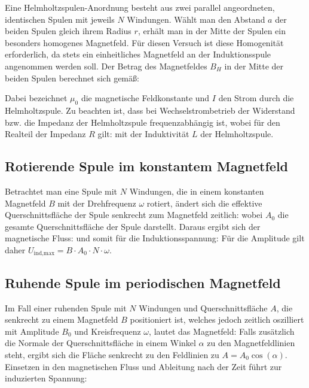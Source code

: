 Eine Helmholtzspulen-Anordnung besteht aus zwei parallel angeordneten, identischen Spulen mit jeweils \( N \) Windungen. Wählt man den Abstand \( a \) der beiden Spulen gleich ihrem Radius \( r \), erhält man in der Mitte der Spulen ein besonders homogenes Magnetfeld. Für diesen Versuch ist diese Homogenität erforderlich, da stets ein einheitliches Magnetfeld an der Induktionsspule angenommen werden soll. Der Betrag des Magnetfeldes \( B_H \) in der Mitte der beiden Spulen berechnet sich gemäß:

Dabei bezeichnet \( \mu_0 \) die magnetische Feldkonstante und \( I \) den Strom durch die Helmholtzspule. Zu beachten ist, dass bei Wechselstrombetrieb der Widerstand bzw. die Impedanz der Helmholtzspule frequenzabhängig ist, wobei für den Realteil der Impedanz \( R \) gilt:
mit der Induktivität \( L \) der Helmholtzspule.

\subsection{Rotierende Spule im konstantem Magnetfeld}

Betrachtet man eine Spule mit \( N \) Windungen, die in einem konstanten Magnetfeld \( B \) mit der Drehfrequenz \( \omega \) rotiert, ändert sich die effektive Querschnittsfläche der Spule senkrecht zum Magnetfeld zeitlich:
wobei \( A_0 \) die gesamte Querschnittsfläche der Spule darstellt. Daraus ergibt sich der magnetische Fluss:
und somit für die Induktionsspannung:
Für die Amplitude gilt daher \( U_{\text{ind,max}} = B \cdot A_0 \cdot N \cdot \omega \).

\subsection{Ruhende Spule im periodischen Magnetfeld}

Im Fall einer ruhenden Spule mit \( N \) Windungen und Querschnittsfläche \( A \), die senkrecht zu einem Magnetfeld \( B \) positioniert ist, welches jedoch zeitlich oszilliert mit Amplitude \( B_0 \) und Kreisfrequenz \( \omega \), lautet das Magnetfeld:
Falls zusätzlich die Normale der Querschnittsfläche in einem Winkel \( \alpha \) zu den Magnetfeldlinien steht, ergibt sich die Fläche senkrecht zu den Feldlinien zu \( A = A_0 \cos(\alpha) \). Einsetzen in den magnetischen Fluss und Ableitung nach der Zeit führt zur induzierten Spannung:

